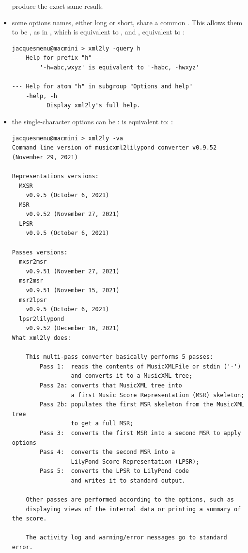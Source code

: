 \begin{itemize}
produce the exact same result;

\item some options names, either long or short, share a common . This allows them to be , as in , which is equivalent to , and , equivalent to :
\begin{lstlisting}[language=Terminal]
jacquesmenu@macmini > xml2ly -query h
--- Help for prefix "h" ---
        '-h=abc,wxyz' is equivalent to '-habc, -hwxyz'

--- Help for atom "h" in subgroup "Options and help"
    -help, -h
          Display xml2ly's full help.
\end{lstlisting}

\item the single-character options can be :  is equivalent to: :
\begin{lstlisting}[language=Terminal]
jacquesmenu@macmini > xml2ly -va
Command line version of musicxml2lilypond converter v0.9.52 (November 29, 2021)

Representations versions:
  MXSR
    v0.9.5 (October 6, 2021)
  MSR
    v0.9.52 (November 27, 2021)
  LPSR
    v0.9.5 (October 6, 2021)

Passes versions:
  mxsr2msr
    v0.9.51 (November 27, 2021)
  msr2msr
    v0.9.51 (November 15, 2021)
  msr2lpsr
    v0.9.5 (October 6, 2021)
  lpsr2lilypond
    v0.9.52 (December 16, 2021)
What xml2ly does:

    This multi-pass converter basically performs 5 passes:
        Pass 1:  reads the contents of MusicXMLFile or stdin ('-')
                 and converts it to a MusicXML tree;
        Pass 2a: converts that MusicXML tree into
                 a first Music Score Representation (MSR) skeleton;
        Pass 2b: populates the first MSR skeleton from the MusicXML tree
                 to get a full MSR;
        Pass 3:  converts the first MSR into a second MSR to apply options
        Pass 4:  converts the second MSR into a
                 LilyPond Score Representation (LPSR);
        Pass 5:  converts the LPSR to LilyPond code
                 and writes it to standard output.

    Other passes are performed according to the options, such as
    displaying views of the internal data or printing a summary of the score.

    The activity log and warning/error messages go to standard error.
\end{lstlisting}

\end{itemize}


